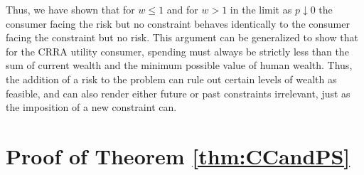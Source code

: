 Thus, we have shown that for $w \leq 1 $ and for $w > 1$ in the limit as $p \downarrow 0$ the consumer facing the risk but no constraint behaves identically to the consumer facing the constraint but no risk. This argument can be generalized to show that for the CRRA utility consumer, spending must always be strictly less than the sum of current wealth and the minimum possible value of human wealth.  Thus, the addition of a risk to the problem can rule out certain levels of wealth as feasible, and can also render either future or past constraints irrelevant, just as the imposition of a new constraint can.


\section{Proof of Theorem \ref{thm:CCandPS}}\label{app:CCandPS}


